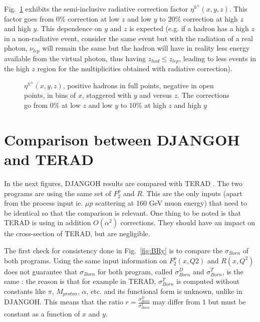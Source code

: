 Fig.~\ref{fig:hadz_ratio} exhibits the semi-inclusive radiative correction factor $\eta^{h^{\pm}}(x,y,z)$. This factor goes from $0$\% correction at low $z$ and low $y$ to $20$\% correction at high $z$ and high $y$. This dependence on $y$ and $z$ is expected (e.g. if a hadron has a high $z$ in a non-radiative event, consider the same event but with the radiation of a real photon, $\nu_{lep}$ will remain the same but the hadron will have in reality less energy available from the virtual photon, thus having $z_{had} \leq z_{lep}$, leading to less events in the high $z$ region for the multiplicities obtained with radiative correction).

\begin{figure}[!htb]
\centerline{}
\caption{$\eta^{h^{\pm}}(x,y,z)$, positive hadrons in full points, negative in open points, in bins of $x$, staggered with $y$ and versus $z$.
The corrections go from $0$\% at low $z$ and low $y$ to 10\% at high $z$ and high $y$}\label{fig:hadz_ratio}
\end{figure}


\section{Comparison between DJANGOH and TERAD}

In the next figures, DJANGOH results are compared with TERAD \cite{TERAD}. The two programs are using the same set of $F^{p}_{2}$ and $R$. This are the only inputs (apart from the process input ie. $\mu p$ scattering at 160 GeV muon energy) that need to be identical so that the comparison is relevant. One thing to be noted is that TERAD is using in addition $O(\alpha^2)$ corrections. They should have an impact on the cross-section of TERAD, but are negligible.

The first check for consistency done in Fig.~\ref{fig:BRy} is to compare the $\sigma_{Born}$ of both programs. Using the same input information on $F^{p}_{2}(x,Q2)$ and $R(x, Q^2)$ does not guarantee that $\sigma_{Born}$ for both program, called $\sigma^{D}_{Born}$ and $\sigma^{T}_{Born}$, is the same : the reason is that for example in TERAD, $\sigma^{T}_{Born}$ is computed without constants like $\pi$, $M_{proton}$, $\alpha$, etc. and its functional form is unknown, unlike in DJANGOH. This means that the ratio $r=\frac{\sigma^{D}_{Born}}{\sigma^{T}_{Born}}$ may differ from 1 but must be constant as a function of $x$ and $y$.

